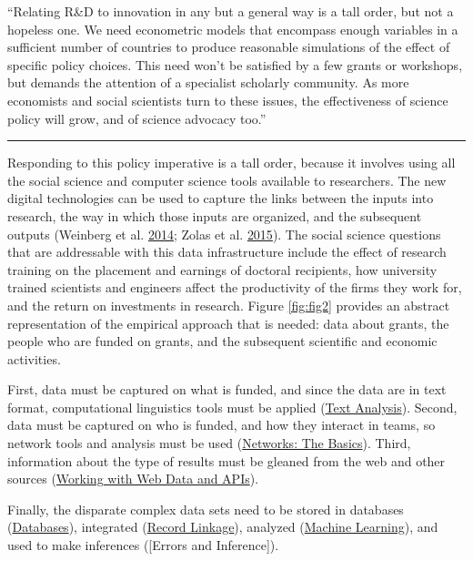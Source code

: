 \documentclass[]{krantz}
\begin{document}
``Relating R\&D to innovation in any but a general way is a tall order,
but not a hopeless one. We need econometric models that encompass enough
variables in a sufficient number of countries to produce reasonable
simulations of the effect of specific policy choices. This need won't be
satisfied by a few grants or workshops, but demands the attention of a
specialist scholarly community. As more economists and social scientists
turn to these issues, the effectiveness of science policy will grow, and
of science advocacy too.''

\begin{center}\rule{0.5\linewidth}{\linethickness}\end{center}

Responding to this policy imperative is a tall order, because it
involves using all the social science and computer science tools
available to researchers. The new digital technologies can be used to
capture the links between the inputs into research, the way in which
those inputs are organized, and the subsequent outputs (Weinberg et al.
\protect\hyperlink{ref-weinberg2014science}{2014}; Zolas et al.
\protect\hyperlink{ref-zolas2015wrapping}{2015}). The social science
questions that are addressable with this data infrastructure include the
effect of research training on the placement and earnings of doctoral
recipients, how university trained scientists and engineers affect the
productivity of the firms they work for, and the return on investments
in research. Figure \ref{fig:fig2} provides an abstract representation
of the empirical approach that is needed: data about grants, the people
who are funded on grants, and the subsequent scientific and economic
activities.

First, data must be captured on what is funded, and since the data are
in text format, computational linguistics tools must be applied
(\protect\hyperlink{chap:text}{Text Analysis}). Second, data must be
captured on who is funded, and how they interact in teams, so network
tools and analysis must be used
(\protect\hyperlink{chap:networks}{Networks: The Basics}). Third,
information about the type of results must be gleaned from the web and
other sources (\protect\hyperlink{chap:web}{Working with Web Data and
APIs}).

Finally, the disparate complex data sets need to be stored in databases
(\protect\hyperlink{databases}{Databases}), integrated
(\protect\hyperlink{chap:link}{Record Linkage}), analyzed
(\protect\hyperlink{chap:ml}{Machine Learning}), and used to make
inferences ({[}Errors and Inference{]}).
\end{document}
